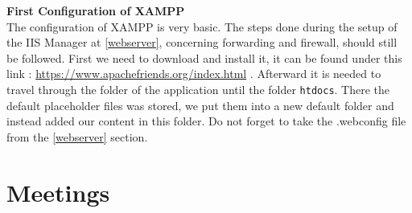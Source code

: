 \documentclass{scrbook}
\begin{document}
\textbf{First Configuration of XAMPP}\\
The configuration of XAMPP is very basic. The steps done during the setup of the IIS Manager at \ref{webserver}, concerning forwarding and firewall, should still be followed. First we need to download and install it, it can be found under this link : \url{https://www.apachefriends.org/index.html} . Afterward it is needed to travel through the folder of the application until the folder 
\texttt{htdocs}. There the default placeholder files was stored, we put them into a new default folder and instead added our content in this folder. Do not forget to take the .webconfig file from the \ref{webserver} section.

\chapter{Meetings}
\end{document}
